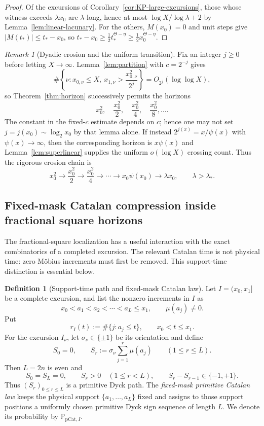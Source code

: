 \documentclass[11pt]{amsart}
\numberwithin{equation}{section}
\theoremstyle{plain}
\theoremstyle{definition}
\newtheorem{definition}[theorem]{Definition}
\theoremstyle{remark}
\newtheorem{remark}[theorem]{Remark}
\begin{document}
\begin{proof}
Of the excursions of Corollary~\ref{cor:KP-large-excursions}, those whose
witness exceeds $\lambda x_0$ are $\lambda$-long, hence at most
$\log X/\log\lambda+2$ by Lemma~\ref{lem:linear-lacunary}. For the others,
$M(x_0)=0$ and unit steps give $|M(t_*)|\le t_*-x_0$, so
$t_*-x_0\ge\frac12t_*^{\Theta-\eta}\ge\frac12x_0^{\Theta-\eta}$.
\end{proof}


\begin{remark}[Dyadic erosion and the uniform transition]
\label{rem:dyadic-erosion}
Fix an integer $j\ge0$ before letting $X\to\infty$.  Lemma~\ref{lem:partition} with
$c=2^{-j}$ gives
\[
\#\left\{\nu:x_{0,\nu}\le X,\ x_{1,\nu}>
\frac{x_{0,\nu}^2}{2^j}\right\}=O_{2^j}(\log\log X),
\]
so Theorem~\ref{thm:horizon} successively permits the horizons
\[
x_0^2,\quad \frac{x_0^2}{2},\quad \frac{x_0^2}{4},\quad
\frac{x_0^2}{8},\ldots.
\]
The constant in the fixed-$c$ estimate depends on $c$; hence one may not set
$j=j(x_0)\sim\log_2x_0$ by that lemma alone.  If instead
$2^{j(x)}=x/\psi(x)$ with $\psi(x)\to\infty$, then the corresponding
horizon is $x\psi(x)$ and Lemma~\ref{lem:superlinear} supplies the uniform
$o(\log X)$ crossing count.  Thus the rigorous erosion chain is
\[
x_0^2\to\frac{x_0^2}{2}\to\frac{x_0^2}{4}\to\cdots
\to x_0\psi(x_0)\to\lambda x_0,\qquad\lambda>\lambda_*.
\]
\end{remark}

\subsection{Fixed-mask Catalan compression inside fractional square horizons}
\label{subsec:catalan-square}

The fractional-square localization has a useful interaction with the exact
combinatorics of a completed excursion.  The relevant Catalan time is not
physical time: zero M\"obius increments must first be removed.  This
support-time distinction is essential below.

\begin{definition}[Support-time path and fixed-mask Catalan law]
\label{def:support-catalan}
Let $I=(x_0,x_1]$ be a complete excursion, and list the nonzero increments in
$I$ as
\[
 x_0<a_1<a_2<\cdots<a_L\le x_1,
 \qquad \mu(a_j)\ne0.
\]
Put
\[
 r_I(t):=\#\{j:a_j\le t\},\qquad x_0<t\le x_1.
\]
For the excursion $I_\nu$, let $\sigma_\nu\in\{\pm1\}$ be its orientation and define
\[
 S_0=0,\qquad
 S_r:=\sigma_\nu\sum_{j=1}^r\mu(a_j)\qquad(1\le r\le L).
\]
Then $L=2n$ is even and
\[
 S_0=S_L=0,\qquad S_r>0\quad(1\le r<L),\qquad
 S_r-S_{r-1}\in\{-1,+1\}.
\]
Thus $(S_r)_{0\le r\le L}$ is a primitive Dyck path.  The
\emph{fixed-mask primitive Catalan law} keeps the physical support
$\{a_1,\dots,a_L\}$ fixed and assigns to those support positions a uniformly
chosen primitive Dyck sign sequence of length $L$.  We denote its probability
by $\mathbb P_{\mathrm{pCat},I}$.
\end{definition}
\end{document}
